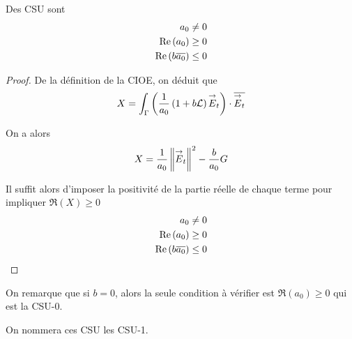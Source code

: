           \begin{prop}
            Des CSU sont
            \begin{align}
              a_0 \not= 0\\
              \operatorname{Re}\left(a_0\right) \ge 0\\
              \operatorname{Re}\left(b{\overline{a_0}}\right) \le 0
            \end{align}
          \end{prop}
          \begin{proof}
            De la définition de la CIOE, on déduit que
            \[
              X = \int_\Gamma \left( \dfrac{1}{a_0}\left(1+b\mathcal{L}\right){\overset{\rightarrow}{E}}_t\right) \cdot {\overline{{\overset{\rightarrow}{E}}_t}} 
            \]

            On a alors
            \begin{equation}
              \label{eq:unicite:form_var:decomp_cgu_ci1_a1_nul}
              X = \dfrac{1}{a_0}\left\lVert{\overset{\rightarrow}{E}}_t\right\rVert^2  - \dfrac{b}{a_0}G
            \end{equation}

            Il suffit alors d'imposer la positivité de la partie réelle de chaque terme pour impliquer \(\Re(X)\ge0\)
            \begin{align}
              a_0 \not= 0
              \\
              \operatorname{Re}\left(a_0\right) \ge 0
              \\
              \operatorname{Re}\left(b{\overline{a_0}}\right) \le 0
            \end{align}
          \end{proof}

          On remarque que si \(b=0\), alors la seule condition à vérifier est \(\Re(a_0) \ge 0\) qui est la CSU-0.


      On nommera ces CSU les CSU-1.

